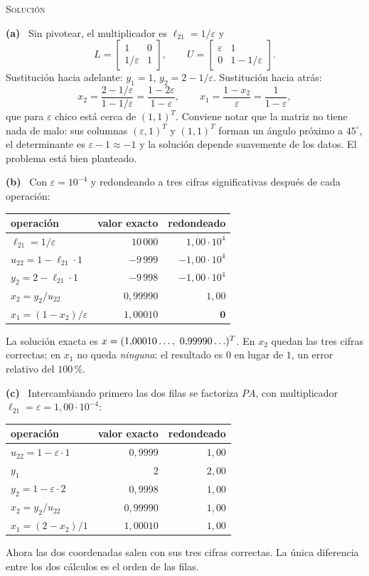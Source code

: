 \documentclass[11pt,a4paper]{article}
\newcommand{\solucion}{\par\medskip\noindent\textsc{Solución}\par\nobreak\smallskip\noindent}
\newcommand{\itemsol}[1]{\par\medskip\noindent\textbf{(#1)}\ \ignorespaces}
\begin{document}
\solucion
\itemsol{a} Sin pivotear, el multiplicador es $\ell_{21}=1/\varepsilon$ y
\[
L=\begin{bmatrix}1&0\\ 1/\varepsilon&1\end{bmatrix},\qquad
U=\begin{bmatrix}\varepsilon&1\\ 0&1-1/\varepsilon\end{bmatrix}.
\]
Sustitución hacia adelante: $y_1=1$, $y_2=2-1/\varepsilon$. Sustitución hacia
atrás:
\[
x_2=\frac{2-1/\varepsilon}{1-1/\varepsilon}=\frac{1-2\varepsilon}{1-\varepsilon},
\qquad
x_1=\frac{1-x_2}{\varepsilon}=\frac{1}{1-\varepsilon},
\]
que para $\varepsilon$ chico está cerca de $(1,1)^T$. Conviene notar que la
matriz no tiene nada de malo: sus columnas $(\varepsilon,1)^T$ y $(1,1)^T$
forman un ángulo próximo a $45^\circ$, el determinante es $\varepsilon-1\approx-1$
y la solución depende suavemente de los datos. El problema está bien planteado.

\itemsol{b} Con $\varepsilon=10^{-4}$ y redondeando a tres cifras significativas
después de cada operación:
\begin{center}
\begin{tabular}{@{}lrr@{}}
\hline
operación & valor exacto & redondeado \\
\hline
$\ell_{21}=1/\varepsilon$ & $10\,000$ & $1{,}00\cdot10^{4}$\\
$u_{22}=1-\ell_{21}\cdot1$ & $-9\,999$ & $-1{,}00\cdot10^{4}$\\
$y_2=2-\ell_{21}\cdot1$ & $-9\,998$ & $-1{,}00\cdot10^{4}$\\
$x_2=y_2/u_{22}$ & $0{,}99990$ & $1{,}00$\\
$x_1=(1-x_2)/\varepsilon$ & $1{,}00010$ & $\mathbf{0}$\\
\hline
\end{tabular}
\end{center}
La solución exacta es $x=(1{,}00010\ldots,\ 0{,}99990\ldots)^T$. En $x_2$
quedan las tres cifras correctas; en $x_1$ no queda \emph{ninguna}: el resultado
es $0$ en lugar de $1$, un error relativo del $100\,\%$.

\itemsol{c} Intercambiando primero las dos filas se factoriza $PA$, con
multiplicador $\ell_{21}=\varepsilon=1{,}00\cdot10^{-4}$:
\begin{center}
\begin{tabular}{@{}lrr@{}}
\hline
operación & valor exacto & redondeado \\
\hline
$u_{22}=1-\varepsilon\cdot1$ & $0{,}9999$ & $1{,}00$\\
$y_1$ & $2$ & $2{,}00$\\
$y_2=1-\varepsilon\cdot2$ & $0{,}9998$ & $1{,}00$\\
$x_2=y_2/u_{22}$ & $0{,}99990$ & $1{,}00$\\
$x_1=(2-x_2)/1$ & $1{,}00010$ & $1{,}00$\\
\hline
\end{tabular}
\end{center}
Ahora las dos coordenadas salen con sus tres cifras correctas. La única
diferencia entre los dos cálculos es el orden de las filas.
\end{document}
